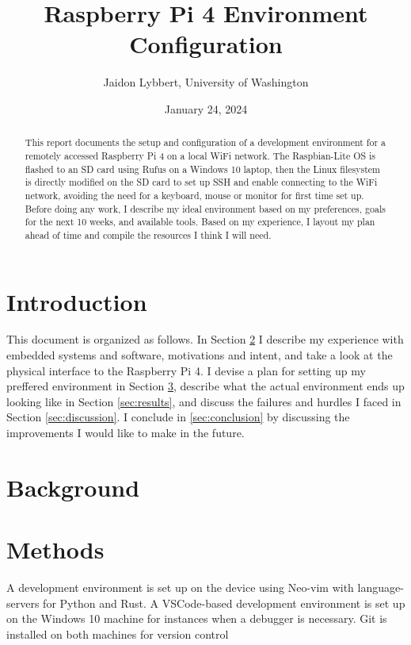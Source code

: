 \documentclass[12pt]{article}
\begin{document}
\title{Raspberry Pi 4 Environment Configuration}
\author{Jaidon Lybbert, University of Washington}
\date{January 24, 2024}


\maketitle

\begin{abstract}
This report documents the setup and configuration of a development environment for a remotely accessed Raspberry Pi 4 on a local WiFi network. The Raspbian-Lite OS is flashed to an SD card using Rufus on a Windows 10 laptop, then the Linux filesystem is directly modified on the SD card to set up SSH and enable connecting to the WiFi network, avoiding the need for a keyboard, mouse or monitor for first time set up.  Before doing any work, I describe my ideal environment based on my preferences, goals for the next 10 weeks, and available tools. Based on my experience, I layout my plan ahead of time and compile the resources I think I will need.
\end{abstract}

\section{Introduction}
This document is organized as follows. In Section \ref{sec:background} I describe my experience with embedded systems and software, motivations and intent, and take a look at the physical interface to the Raspberry Pi 4. I devise a plan for setting up my preffered environment in Section \ref{sec:methods}, describe what the actual environment ends up looking like in Section \ref{sec:results}, and discuss the failures and hurdles I faced in Section \ref{sec:discussion}. I conclude in \ref{sec:conclusion} by discussing the improvements I would like to make in the future.

\section{Background}\label{sec:background}


\section{Methods}\label{sec:methods}
A development environment is set up on the device using Neo-vim with language-servers for Python and Rust. A VSCode-based development environment is set up on the Windows 10 machine for instances when a debugger is necessary. Git is installed on both machines for version control
\end{document}
